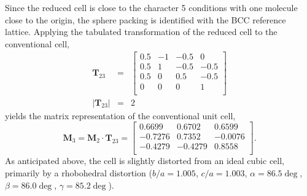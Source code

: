 \documentclass[preprint]{iucr}              %
\begin{document}
Since the reduced cell is close to the character 5 conditions with one molecule close to the origin, the sphere packing is identified with the BCC reference lattice.  Applying the tabulated transformation of the reduced cell to the conventional cell, \cite{Hahn02VolASec9.2}
\begin{eqnarray}
   \mathbf{T}_{23}&=&\left[
     \begin{array}{cccc}
        0.5 & -1 & -0.5 & 0\\
        0.5 &  1 & -0.5 & -0.5\\
        0.5 &  0 &  0.5 & -0.5\\
	  0   &  0 &  0   & 1\\
     \end{array}
  \right]\\
   \vert\mathbf{T}_{23}\vert&=&2
\end{eqnarray}
yields the matrix representation of the conventional unit cell,
\begin{equation}
   \mathbf{M}_{3}=\mathbf{M}_{2}\cdot\mathbf{T}_{23}=\left[
     \begin{array}{ccc}
        0.6699& 0.6702& 0.6599\\
        -0.7276& 0.7352& -0.0076\\
        -0.4279& -0.4279& 0.8558\\
     \end{array}
  \right].
\end{equation}
As anticipated above, the cell is slightly distorted from an ideal cubic cell, primarily by a rhobohedral distortion ($b/a=1.005$, $c/a=1.003$, $\alpha=86.5\deg$, $\beta=86.0\deg$, $\gamma=85.2\deg$).
\end{document}

